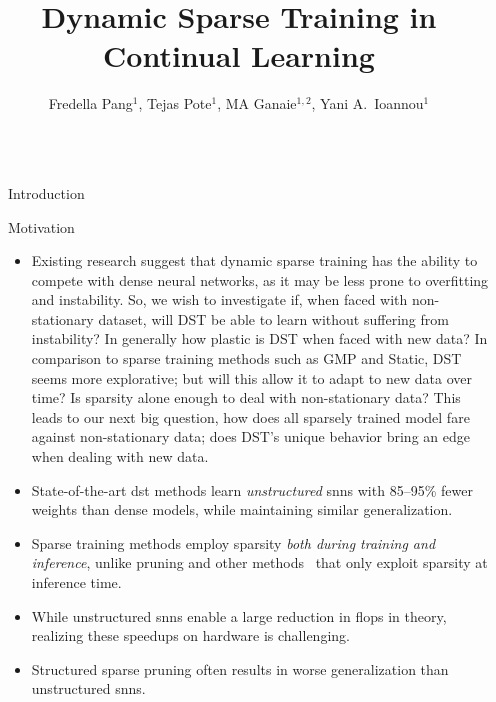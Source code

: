 \documentclass[final]{beamer}
\title{Dynamic Sparse Training in Continual Learning}
\author{
    Fredella Pang$^{1}$,
    Tejas Pote$^{1}$,
    MA Ganaie$^{1,2}$,
    Yani A.\ Ioannou$^{1}$
}
\institute[shortinst]{
    $^{1}$University of Calgary \samelineand
    $^2$Vector Institute for AI
}
\newlength{\sepwidth}
\newlength{\colwidth}
\newcommand{\separatorcolumn}{\begin{column}{\sepwidth}\end{column}}
\begin{document}
\begin{frame}[t]
\begin{columns}[t]
\separatorcolumn

\begin{column}{\colwidth}
  \begin{block}{Introduction}
  \end{block}
  \begin{block}{Motivation}
  \begin{itemize}

\item Existing research suggest that dynamic sparse training has the ability to compete with dense neural networks, as it may be less prone to overfitting and instability.
So, we wish to investigate if, when faced with non-stationary dataset, will DST be able to learn without suffering from instability? In generally how plastic is DST when faced with new data? In comparison to sparse training methods such as GMP and Static, DST seems more explorative; but will this allow it to adapt to new data over time?
Is sparsity alone enough to deal with non-stationary data?
This leads to our next big question, how does all sparsely trained model fare against non-stationary data; does DST’s unique behavior bring an edge when dealing with new data.


      \item State-of-the-art \Gls{dst} methods learn \emph{unstructured} \glspl{snn} with 85--95\% fewer weights than dense models, while maintaining similar generalization.

      \item Sparse training methods employ sparsity \emph{both during training and inference}, unlike pruning and other methods~\citep{zhou2021learning} that only exploit sparsity at inference time.

      \item While unstructured \glspl{snn} enable a large reduction in \gls{flops} in theory, realizing these speedups on hardware is challenging.
      \item Structured sparse pruning often results in worse generalization than unstructured \glspl{snn}.
  \end{itemize}
  \end{block}


\end{column}
\end{columns}
\end{frame}
\end{document}
